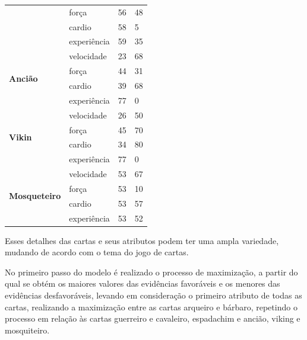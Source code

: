 \begin{table}[htb]
\begin{tabular}{|l|l|l|l|}
		& força              & 56                 & 48                    \\ \cline{2-4} 
		& cardio             & 58                 & 5                     \\ \cline{2-4} 
		& experiência        & 59                 & 35                    \\ \hline
		\multirow{4}{*}{\textbf{Ancião}}      & velocidade         & 23                 & 68                    \\ \cline{2-4} 
		& força              & 44                 & 31                    \\ \cline{2-4} 
		& cardio             & 39                 & 68                    \\ \cline{2-4} 
		& experiência        & 77                 & 0                     \\ \hline
		\multirow{4}{*}{\textbf{Vikin}}       & velocidade         & 26                 & 50                    \\ \cline{2-4} 
		& força              & 45                 & 70                    \\ \cline{2-4} 
		& cardio             & 34                 & 80                    \\ \cline{2-4} 
		& experiência        & 77                 & 0                     \\ \hline
		\multirow{4}{*}{\textbf{Mosqueteiro}} & velocidade         & 53                 & 67                    \\ \cline{2-4} 
		& força              & 53                 & 10                    \\ \cline{2-4} 
		& cardio             & 53                 & 57                    \\ \cline{2-4} 
		& experiência        & 53                 & 52                    \\ \hline
	\end{tabular}
\end{table}

Esses detalhes das cartas e seus atributos podem ter uma ampla variedade, mudando de acordo com o tema do jogo de cartas.

No primeiro passo do modelo é realizado o processo de maximização, a partir do qual se obtém os maiores valores das evidências favoráveis e os menores das evidências desfavoráveis, levando em consideração o primeiro atributo de todas as cartas, realizando a maximização entre as cartas arqueiro e bárbaro, repetindo o processo em relação às cartas guerreiro e cavaleiro, espadachim e ancião, viking e mosquiteiro.


